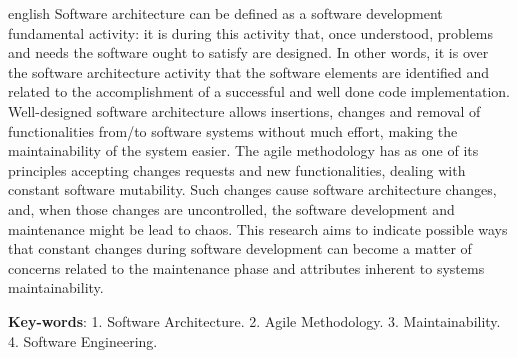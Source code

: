 \begin{resumo}[Abstract]
 \begin{otherlanguage*}{english}
Software architecture can be defined as a software development fundamental activity: it is during this activity that, once understood, problems and needs the software ought to satisfy are designed. In other words, it is over the software architecture activity that the software elements are identified and related to the accomplishment of a successful and well done code implementation. Well-designed software architecture allows insertions, changes and removal of functionalities from/to software systems without much effort, making the maintainability of the system easier. The agile methodology has as one of its principles accepting changes requests and new functionalities, dealing with constant software mutability. Such changes cause software architecture changes, and, when those changes are uncontrolled, the software development and maintenance might be lead to chaos. This research aims to indicate possible ways that constant changes during software development can become a matter of concerns related to the maintenance phase and attributes inherent to systems maintainability.

   \vspace{\onelineskip}
 
   \noindent 
   \textbf{Key-words}: 1. Software Architecture. 2. Agile Methodology. 3. Maintainability. 4. Software Engineering.
 \end{otherlanguage*}
\end{resumo}
